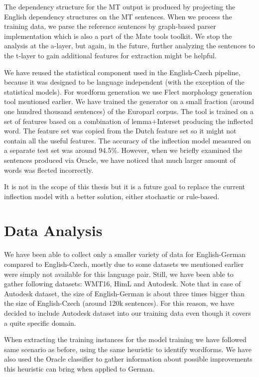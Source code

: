 The dependency structure for the MT output is produced by projecting the English dependency
structures on the MT sentences. When we process the training data, we parse the reference sentences
by graph-based parser implementation \citep{Bohnet:2010:VHA:1873781.1873792} which is also a part of the
Mate tools toolkit. We stop the analysis at the a-layer, but again, in the future, further analyzing
the sentences to the t-layer to gain additional features for extraction might be helpful.

We have reused the statistical component used in the English-Czech pipeline, because it was designed to be
language independent (with the exception of the statistical models). For wordform generation we use
Flect morphology generation tool mentioned earlier. We have trained the generator on a small
fraction (around one hundred thousand sentences) of the Europarl corpus. The tool is trained on a set
of features based on a combination of lemma$+$Interset producing the inflected word. The feature set
was copied from the Dutch feature set so it might not contain all the useful features. The accuracy
of the inflection model measured on a separate test set was around 94.5\%. However, when we briefly examined
the sentences produced via Oracle, we have noticed that much larger amount of words was flected incorrectly.

It is not in the scope of this thesis but it is a future goal to replace the current inflection model
with a better solution, either stochastic or rule-based.

\section{Data Analysis}

We have been able to collect only a smaller variety of data for English-German compared to English-Czech,
 mostly due to some datasets we mentioned earlier were simply not available for this language pair. Still, we have been
able to gather following datasets: WMT16, HimL and Autodesk. Note that in case of Autodesk dataset,
the size of English-German is about three times bigger than the size of English-Czech (around 120k sentences).
For this reason, we have decided to include Autodesk dataset into our training data even though it covers
a quite specific domain.

When extracting the training instances for the model training we have followed same scenario
as before, using the same heuristic to identify  wordforms. We have also used the Oracle
classifier to gather information about possible improvements this heuristic can bring when applied to German.

